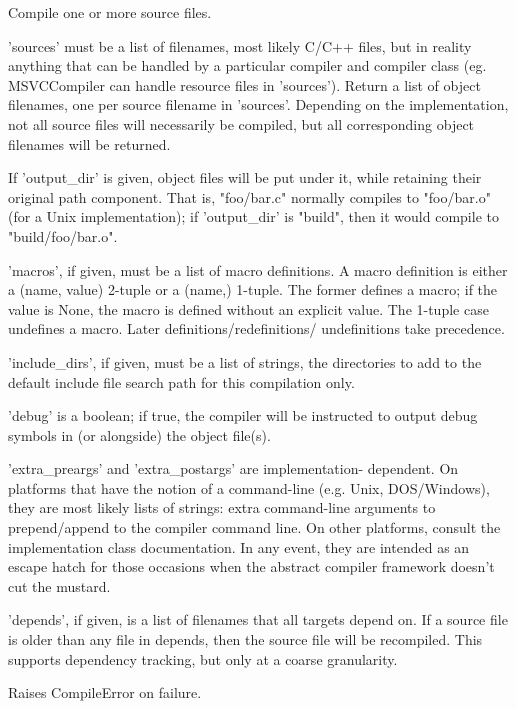 \begin{DoxyVerb}Compile one or more source files.

'sources' must be a list of filenames, most likely C/C++
files, but in reality anything that can be handled by a
particular compiler and compiler class (eg. MSVCCompiler can
handle resource files in 'sources').  Return a list of object
filenames, one per source filename in 'sources'.  Depending on
the implementation, not all source files will necessarily be
compiled, but all corresponding object filenames will be
returned.

If 'output_dir' is given, object files will be put under it, while
retaining their original path component.  That is, "foo/bar.c"
normally compiles to "foo/bar.o" (for a Unix implementation); if
'output_dir' is "build", then it would compile to
"build/foo/bar.o".

'macros', if given, must be a list of macro definitions.  A macro
definition is either a (name, value) 2-tuple or a (name,) 1-tuple.
The former defines a macro; if the value is None, the macro is
defined without an explicit value.  The 1-tuple case undefines a
macro.  Later definitions/redefinitions/ undefinitions take
precedence.

'include_dirs', if given, must be a list of strings, the
directories to add to the default include file search path for this
compilation only.

'debug' is a boolean; if true, the compiler will be instructed to
output debug symbols in (or alongside) the object file(s).

'extra_preargs' and 'extra_postargs' are implementation- dependent.
On platforms that have the notion of a command-line (e.g. Unix,
DOS/Windows), they are most likely lists of strings: extra
command-line arguments to prepend/append to the compiler command
line.  On other platforms, consult the implementation class
documentation.  In any event, they are intended as an escape hatch
for those occasions when the abstract compiler framework doesn't
cut the mustard.

'depends', if given, is a list of filenames that all targets
depend on.  If a source file is older than any file in
depends, then the source file will be recompiled.  This
supports dependency tracking, but only at a coarse
granularity.

Raises CompileError on failure.
\end{DoxyVerb}
 \mbox{\label{classsetuptools_1_1__distutils_1_1ccompiler_1_1CCompiler_a1fa1a52d9f871d9697f5813f9f02da7e}} 
